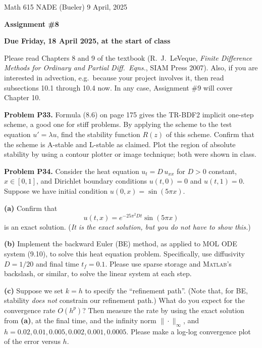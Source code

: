 \documentclass[12pt]{amsart}
\newcommand{\Matlab}{\textsc{Matlab}\xspace}
\newcommand{\prob}[1]{\bigskip\noindent\textbf{#1}\quad }
\newcommand{\epart}[1]{\medskip\noindent\textbf{(#1)}\quad }
\begin{document}
\scriptsize \noindent Math 615 NADE (Bueler) \hfill 9 April, 2025
\normalsize

\medskip\bigskip

\Large\centerline{\textbf{Assignment \#8}}
\large
\bigskip

\centerline{\textbf{Due Friday, 18 April 2025, at the start of class}}
\bigskip
\normalsize

\thispagestyle{empty}

\bigskip
Please read Chapters 8 and 9 of the textbook (R.~J.~LeVeque, \emph{Finite Difference Methods for Ordinary and Partial Diff.~Eqns.}, SIAM Press 2007).  Also, if you are interested in advection, e.g.~because your project involves it, then read subsections 10.1 through 10.4 now.  In any case, Assignment \#9 will cover Chapter 10.

\medskip

\prob{Problem P33.}  Formula (8.6) on page 175 gives the TR-BDF2 implicit one-step scheme, a good one for stiff problems.  By applying the scheme to the test equation $u'=\lambda u$, find the stability function $R(z)$ of this scheme.  Confirm that the scheme is A-stable and L-stable as claimed.  Plot the region of absolute stability by using a contour plotter or image technique; both were shown in class.


\prob{Problem P34.}  Consider the heat equation $u_t = D\, u_{xx}$ for $D>0$ constant, $x\in [0,1]$, and Dirichlet boundary conditions $u(t,0)=0$ and $u(t,1)=0$.  Suppose we have initial condition $u(0,x) = \sin(5\pi x)$.

\epart{a}  Confirm that
    $$u(t,x) = e^{-25 \pi^2 D t} \sin(5 \pi x)$$
is an exact solution.  (\emph{It is \emph{the} exact solution, but you do not have to show this.})

\epart{b}  Implement the backward Euler (BE) method, as applied to MOL ODE system (9.10), to solve this heat equation problem.  Specifically, use diffusivity $D = 1/20$ and final time $t_f=0.1$.  Please use sparse storage and \Matlab's backslash, or similar, to solve the linear system at each step.

\epart{c}  Suppose we set $k=h$ to specify the ``refinement path''.  (Note that, for BE, stability \emph{does not} constrain our refinement path.)  What do you expect for the convergence rate $O(h^p)$?  Then measure the rate by using the exact solution from \textbf{(a)}, at the final time, and the infinity norm $\|\cdot\|_\infty$, and $h=0.02, 0.01,0.005,0.002,0.001,0.0005$.  Please make a log-log convergence plot of the error versus $h$.
\end{document}
